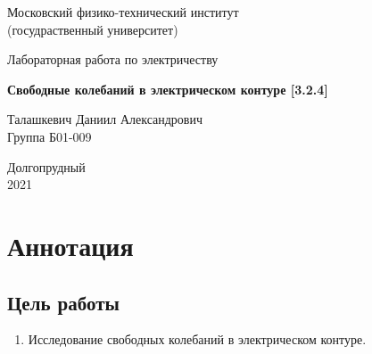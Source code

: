 \documentclass[a4paper, 12pt]{article}%
\begin{document}


\begin{titlepage}

	\newpage
	\begin{center}
		\normalsize Московский физико-технический институт \\(госудраственный 			университет)
	\end{center}

	\vspace{6em}

	\begin{center}
		\Large Лабораторная работа по электричеству\\
	\end{center}

	\vspace{1em}

	\begin{center}
		\large \textbf{Свободные колебаний в электрическом контуре [3.2.4]}
	\end{center}

	\vspace{2em}

	\begin{center}
		\large Талашкевич Даниил Александрович\\
		Группа Б01-009
	\end{center}

	\vspace{\fill}

	\begin{center}
	Долгопрудный \\2021
	\end{center}
	
\end{titlepage}



	\thispagestyle{empty}
	\newpage
	\tableofcontents
	\newpage
	\setcounter{page}{1}



\section{Аннотация}

\subsection{Цель работы}
\begin{enumerate}
\item   Исследование свободных колебаний в электрическом контуре.
\end{enumerate}
\end{document}
